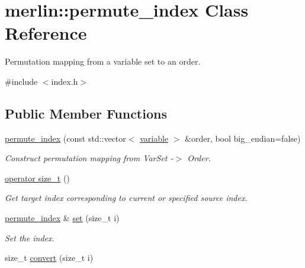 \hypertarget{classmerlin_1_1permute__index}{}\section{merlin\+:\+:permute\+\_\+index Class Reference}
\label{classmerlin_1_1permute__index}


Permutation mapping from a variable set to an order.  




{\ttfamily \#include $<$index.\+h$>$}

\subsection*{Public Member Functions}
\begin{DoxyCompactItemize}
\item 
\hypertarget{classmerlin_1_1permute__index_ae8aa08b953ea59704f5035ce0f94063b}{}\hyperlink{classmerlin_1_1permute__index_ae8aa08b953ea59704f5035ce0f94063b}{permute\+\_\+index} (const std\+::vector$<$ \hyperlink{classmerlin_1_1variable}{variable} $>$ \&order, bool big\+\_\+endian=false)\label{classmerlin_1_1permute__index_ae8aa08b953ea59704f5035ce0f94063b}

\begin{DoxyCompactList}\small\item\em Construct permutation mapping from Var\+Set -\/$>$ Order. \end{DoxyCompactList}\item 
\hypertarget{classmerlin_1_1permute__index_a20c91878fc17cffe106eb53dedc0689c}{}\hyperlink{classmerlin_1_1permute__index_a20c91878fc17cffe106eb53dedc0689c}{operator size\+\_\+t} ()\label{classmerlin_1_1permute__index_a20c91878fc17cffe106eb53dedc0689c}

\begin{DoxyCompactList}\small\item\em Get target index corresponding to current or specified source index. \end{DoxyCompactList}\item 
\hypertarget{classmerlin_1_1permute__index_ae83e48c24acec69dc39f70804ae61ca9}{}\hyperlink{classmerlin_1_1permute__index}{permute\+\_\+index} \& \hyperlink{classmerlin_1_1permute__index_ae83e48c24acec69dc39f70804ae61ca9}{set} (size\+\_\+t i)\label{classmerlin_1_1permute__index_ae83e48c24acec69dc39f70804ae61ca9}

\begin{DoxyCompactList}\small\item\em Set the index. \end{DoxyCompactList}\item 
\hypertarget{classmerlin_1_1permute__index_ace987194d5be9586ead5c7862fc41d4b}{}size\+\_\+t \hyperlink{classmerlin_1_1permute__index_ace987194d5be9586ead5c7862fc41d4b}{convert} (size\+\_\+t i)\label{classmerlin_1_1permute__index_ace987194d5be9586ead5c7862fc41d4b}


\end{DoxyCompactItemize}
